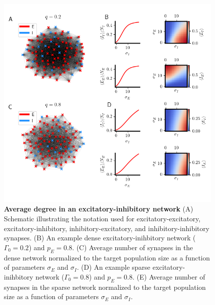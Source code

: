 \documentclass{ucetd}
\begin{document}
\clearpage
\begin{figure}[t!]
\centering
\includegraphics[width=165mm]{fig_10}
\caption{\textbf{Average degree in an excitatory-inhibitory network} (A) Schematic illustrating the notation used for excitatory-excitatory, excitatory-inhibitory, inhibitory-excitatory, and inhibitory-inhibitory synapses. (B) An example dense excitatory-inihbitory network ($\Gamma_{0}=0.2$) and $p_{E} = 0.8$. (C) Average number of synapses in the dense network normalized to the target population size as a function of parameters $\sigma_{E}$ and $\sigma_{I}$. (D) An example sparse excitatory-inihbitory network ($\Gamma_{0}=0.8$) and $p_{E} = 0.8$. (E) Average number of synapses in the sparse network normalized to the target population size as a function of parameters $\sigma_{E}$ and $\sigma_{I}$.}
\end{figure}
\end{document}
